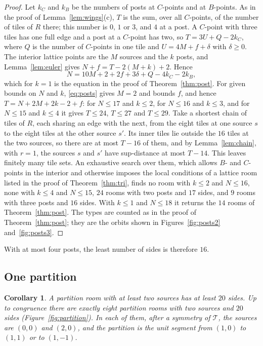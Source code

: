 \documentclass[11pt,a4paper]{article}
\theoremstyle{plain}
\newtheorem{corollary}[theorem]{Corollary}
\theoremstyle{definition}
\theoremstyle{remark}
\newcommand{\T}{\mathcal{T}}
\numberwithin{equation}{section}
\begin{document}
\begin{proof}
Let $k_C$ and $k_B$ be the numbers of posts at $C$-points and at $B$-points. As in the proof of Lemma~\ref{lem:wings}(c), $T$ is the sum, over all $C$-points, of the number of tiles of $R$ there; this number is $0$, $1$ or $3$, and $4$ at a post. A $C$-point with three tiles has one full edge and a post at a $C$-point has two, so $T=3U+Q-2k_C$, where $Q$ is the number of $C$-points in one tile and $U=4M+f+\delta$ with $\delta\ge0$. The interior lattice points are the $M$ sources and the $k$ posts, and Lemma~\ref{lem:euler} gives $N+f=T-2(M+k)+2$. Hence
\begin{equation}\label{eq:posts}
N=10M+2+2f+3\delta+Q-4k_C-2k_B,
\end{equation}
which for $k=1$ is the equation in the proof of Theorem~\ref{thm:post}. For given bounds on $N$ and $k$, \eqref{eq:posts} gives $M=2$ and bounds $f$, and hence $T=N+2M+2k-2+f$: for $N\le17$ and $k\le2$, for $N\le16$ and $k\le3$, and for $N\le15$ and $k\le4$ it gives $T\le24$, $T\le27$ and $T\le29$. Take a shortest chain of tiles of $R$, each sharing an edge with the next, from the eight tiles at one source $s$ to the eight tiles at the other source $s'$. Its inner tiles lie outside the $16$ tiles at the two sources, so there are at most $T-16$ of them, and by Lemma~\ref{lem:chain}, with $r=1$, the sources $s$ and $s'$ have sup-distance at most $T-14$. This leaves finitely many tile sets. An exhaustive search over them, which allows $B$- and $C$-points in the interior and otherwise imposes the local conditions of a lattice room listed in the proof of Theorem~\ref{thm:tri}, finds no room with $k\le2$ and $N\le16$, none with $k\le4$ and $N\le15$, $24$ rooms with two posts and $17$ sides, and $9$ rooms with three posts and $16$ sides. With $k\le1$ and $N\le18$ it returns the $14$ rooms of Theorem~\ref{thm:post}. The types are counted as in the proof of Theorem~\ref{thm:post}; they are the orbits shown in Figures~\ref{fig:posts2} and~\ref{fig:posts3}.
\end{proof}

With at most four posts, the least number of sides is therefore $16$.

\subsection{One partition}
\begin{corollary}\label{cor:partition}
A partition room with at least two sources has at least $20$ sides. Up to congruence there are exactly eight partition rooms with two sources and $20$ sides \textup{(}Figure~\textup{\ref{fig:partition}}\textup{)}. In each of them, after a symmetry of $\T$, the sources are $(0,0)$ and $(2,0)$, and the partition is the unit segment from $(1,0)$ to $(1,1)$ or to $(1,-1)$.
\end{corollary}
\end{document}
